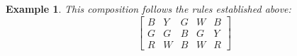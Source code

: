 \documentclass{scrartcl}
\newtheorem{example}{Example}
\begin{document}
\begin{example}
This composition follows the rules established above:
\begin{equation}\nonumber
\begin{bmatrix}
	B & Y & G & W & B \\
	G & G & B & G & Y \\
	R & W & B & W & R
\end{bmatrix}
\end{equation}
\end{example}
\end{document}
